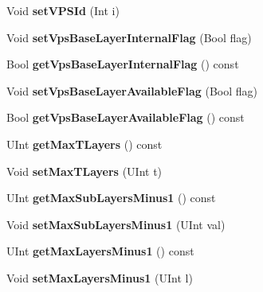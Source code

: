 \begin{DoxyCompactItemize}
Void {\bfseries set\+V\+P\+S\+Id} (Int i)
\item 
\mbox{\label{class_t_com_v_p_s_a0e60c8c5dfd1ef3ec34d29c2f0ad122e}} 
Void {\bfseries set\+Vps\+Base\+Layer\+Internal\+Flag} (Bool flag)
\item 
\mbox{\label{class_t_com_v_p_s_af67f2a12386cfdb890748749533bf29d}} 
Bool {\bfseries get\+Vps\+Base\+Layer\+Internal\+Flag} () const
\item 
\mbox{\label{class_t_com_v_p_s_a164d0099f00b751f3415d092dd38a980}} 
Void {\bfseries set\+Vps\+Base\+Layer\+Available\+Flag} (Bool flag)
\item 
\mbox{\label{class_t_com_v_p_s_a1aa96e477ff420a690cf5cdce8bbf8c7}} 
Bool {\bfseries get\+Vps\+Base\+Layer\+Available\+Flag} () const
\item 
\mbox{\label{class_t_com_v_p_s_a94302ccf060fe310dbb35660cd6c68e9}} 
U\+Int {\bfseries get\+Max\+T\+Layers} () const
\item 
\mbox{\label{class_t_com_v_p_s_a46269778fba013b707d15bfdc8df3255}} 
Void {\bfseries set\+Max\+T\+Layers} (U\+Int t)
\item 
\mbox{\label{class_t_com_v_p_s_a932b7ef2e385b217eddc2ad402165e2a}} 
U\+Int {\bfseries get\+Max\+Sub\+Layers\+Minus1} () const
\item 
\mbox{\label{class_t_com_v_p_s_a34040bdc296519e8bf3d0189d21671db}} 
Void {\bfseries set\+Max\+Sub\+Layers\+Minus1} (U\+Int val)
\item 
\mbox{\label{class_t_com_v_p_s_a4b3651decb07da59b641b033f628225b}} 
U\+Int {\bfseries get\+Max\+Layers\+Minus1} () const
\item 
\mbox{\label{class_t_com_v_p_s_a6191fb30464f9ec3db87fe53267c1caf}} 
Void {\bfseries set\+Max\+Layers\+Minus1} (U\+Int l)
\item 
\mbox{\label{class_t_com_v_p_s_af4d07e41b14e7a8b0f4cc723717d2a92}} 

\end{DoxyCompactItemize}
